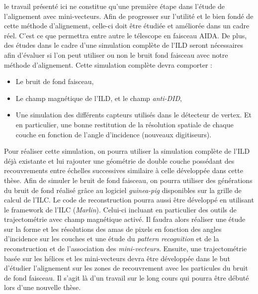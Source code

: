 \medskip 
 
le travail pr\'esent\'e ici ne constitue qu'une premi\`ere \'etape dans l'\'etude de l'alignement avec mini-vecteurs. Afin de progresser sur l'utilit\'e et le bien fond\'e de cette m\'ethode d'alignement, celle-ci doit \^etre \'etudi\'ee et am\'elior\'ee dans un cadre r\'eel. C'est ce que permettra entre autre le t\'elescope en faisceau AIDA. De plus, des \'etudes dans le cadre d'une simulation compl\`ete de l'ILD seront n\'ecessaires afin d'\'evaluer si l'on peut utiliser ou non le bruit fond faisceau avec notre m\'ethode d'alignement. Cette simulation compl\`ete devra comporter :
  
  \medskip
  
  \renewcommand{\labelitemi}{$\bullet$}
  \begin{itemize}
   \item Le bruit de fond faisceau,
   \item Le champ magn\'etique de l'ILD, et le champ \textit{anti-DID},
   \item Une simulation des diff\'erents capteurs utilis\'es dans le d\'etecteur de vertex. Et en particulier, une bonne restitution de la r\'esolution spatiale de chaque couche en fonction de l'angle d'incidence (nouveaux digitiseurs).
  \end{itemize}
  
  \medskip
  
  Pour r\'ealiser cette simulation, on pourra utiliser la simulation compl\`ete de l'ILD d\'ejà existante et lui rajouter une g\'eom\'etrie de double couche poss\'edant des recouvrements entre \'echelles successives similaire \`a celle d\'evelopp\'ee dans cette th\`ese. Afin de simuler le bruit de fond faisceau, on pourra utiliser des g\'en\'erations du bruit de fond r\'ealisé gr\^ace au logiciel \textit{guinea-pig} disponibles sur la grille de calcul de l'ILC. Le code de reconstruction pourra aussi \^etre d\'evelopp\'e en utilisant le framework de l'ILC (\textit{Marlin}). Celui-ci incluant en particulier des outils de trajectom\'etrie avec champ magn\'etique activ\'e. Il faudra alors r\'ealiser une \'etude sur la forme et les r\'esolutions des amas de pixels en fonction des angles d'incidence sur les couches et une \'etude du \textit{pattern recognition} et de la reconstruction et de l'association des \textit{mini-vecteurs}. Ensuite, une trajectom\'etrie bas\'ee sur les h\'elices et les mini-vecteurs devra \^etre d\'evelopp\'ee dans le but d'\'etudier l'alignement sur les zones de recouvrement avec les particules du bruit de fond faisceau. Il s'agit l\`a d'un travail sur le long cours qui pourra \^etre d\'ebut\'e lors d'une nouvelle th\`ese.
  
